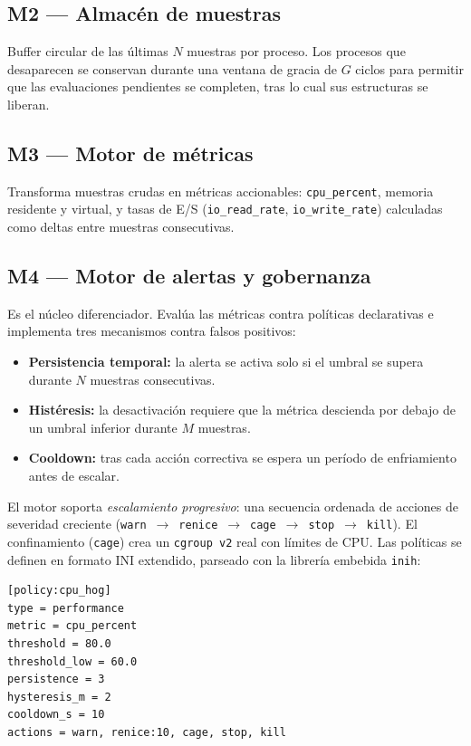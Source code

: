 \documentclass[conference]{IEEEtran}
\begin{document}
\subsection{M2 — Almacén de muestras}
Buffer circular de las últimas $N$ muestras por proceso. Los procesos que
desaparecen se conservan durante una ventana de gracia de $G$ ciclos para
permitir que las evaluaciones pendientes se completen, tras lo cual sus
estructuras se liberan.

\subsection{M3 — Motor de métricas}
Transforma muestras crudas en métricas accionables: \texttt{cpu\_percent},
memoria residente y virtual, y tasas de E/S (\texttt{io\_read\_rate},
\texttt{io\_write\_rate}) calculadas como deltas entre muestras consecutivas.

\subsection{M4 — Motor de alertas y gobernanza}
Es el núcleo diferenciador. Evalúa las métricas contra políticas declarativas e
implementa tres mecanismos contra falsos positivos:
\begin{itemize}
\item \textbf{Persistencia temporal:} la alerta se activa solo si el umbral se
supera durante $N$ muestras consecutivas.
\item \textbf{Histéresis:} la desactivación requiere que la métrica descienda por
debajo de un umbral inferior durante $M$ muestras.
\item \textbf{Cooldown:} tras cada acción correctiva se espera un período de
enfriamiento antes de escalar.
\end{itemize}

El motor soporta \emph{escalamiento progresivo}: una secuencia ordenada de
acciones de severidad creciente
(\texttt{warn}~$\rightarrow$~\texttt{renice}~$\rightarrow$~\texttt{cage}~$\rightarrow$~\texttt{stop}~$\rightarrow$~\texttt{kill}).
El confinamiento (\texttt{cage}) crea un \texttt{cgroup~v2} real con límites de
CPU. Las políticas se definen en formato INI extendido, parseado con la librería
embebida \texttt{inih}:

\begin{lstlisting}
[policy:cpu_hog]
type = performance
metric = cpu_percent
threshold = 80.0
threshold_low = 60.0
persistence = 3
hysteresis_m = 2
cooldown_s = 10
actions = warn, renice:10, cage, stop, kill
\end{lstlisting}
\end{document}
